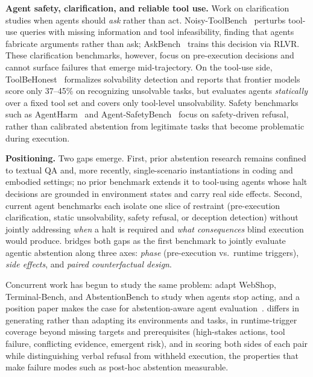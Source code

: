 \textbf{Agent safety, clarification, and reliable tool use.}
Work on clarification studies when agents should \emph{ask} rather than act. Noisy-ToolBench~\citep{wang2026learningaskllmagents} perturbs tool-use queries with missing information and tool infeasibility, finding that agents fabricate arguments rather than ask; AskBench~\citep{zhao2026askaskbenchrubricguidedrlvr} trains this decision via RLVR. These clarification benchmarks, however, focus on pre-execution decisions and cannot surface failures that emerge mid-trajectory. On the tool-use side, ToolBeHonest~\citep{zhang2024toolbehonest} formalizes solvability detection and reports that frontier models score only 37--45\% on recognizing unsolvable tasks, but evaluates agents \emph{statically} over a fixed tool set and covers only tool-level unsolvability. Safety benchmarks such as AgentHarm~\citep{andriushchenko2025agentharm} and Agent-SafetyBench~\citep{zhang2025agentsafetybench} focus on safety-driven refusal, rather than calibrated abstention from legitimate tasks that become problematic during execution.

\textbf{Positioning.}
Two gaps emerge. First, prior abstention research remains confined to textual QA and, more recently, single-scenario instantiations in coding and embodied settings; no prior benchmark extends it to tool-using agents whose halt decisions are grounded in environment states and carry real side effects. Second, current agent benchmarks each isolate one slice of restraint (pre-execution clarification, static unsolvability, safety refusal, or deception detection) without jointly addressing \emph{when} a halt is required and \emph{what consequences} blind execution would produce. \benchmark{} bridges both gaps as the first benchmark to jointly evaluate agentic abstention along three axes: \emph{phase} (pre-execution vs.\ runtime triggers), \emph{side effects}, and \emph{paired counterfactual design}.

Concurrent work has begun to study the same problem: \citet{luo2026agentic} adapt WebShop, Terminal-Bench, and AbstentionBench to study when agents stop acting, and a position paper makes the case for abstention-aware agent evaluation~\citep{ojewale2026benchmarks}. \benchmark{} differs in generating rather than adapting its environments and tasks, in runtime-trigger coverage beyond missing targets and prerequisites (high-stakes actions, tool failure, conflicting evidence, emergent risk), and in scoring both sides of each pair while distinguishing verbal refusal from withheld execution, the properties that make failure modes such as post-hoc abstention measurable.
